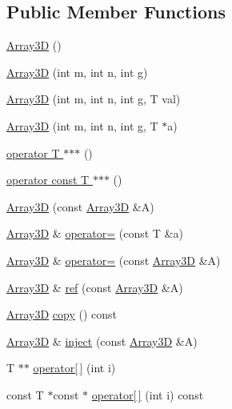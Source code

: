 \subsection*{Public Member Functions}
\begin{DoxyCompactItemize}
\item 
\hyperlink{classTNT_1_1Array3D_a94ceeeadc5904e9ec4069ef61394ff8e}{Array3\-D} ()
\item 
\hyperlink{classTNT_1_1Array3D_a3556263018d605d22ce74699f3898559}{Array3\-D} (int m, int n, int g)
\item 
\hyperlink{classTNT_1_1Array3D_a3e5d89a3999c39540a441aeebcd8edc4}{Array3\-D} (int m, int n, int g, T val)
\item 
\hyperlink{classTNT_1_1Array3D_a5830c3a1275b2498bdceb6502e63c28f}{Array3\-D} (int m, int n, int g, T $\ast$a)
\item 
\hyperlink{classTNT_1_1Array3D_a35b7704b6c061b4150d64592650ba83f}{operator T $\ast$$\ast$$\ast$} ()
\item 
\hyperlink{classTNT_1_1Array3D_a420ffed5ca81952d989afe406450a9b0}{operator const T $\ast$$\ast$$\ast$} ()
\item 
\hyperlink{classTNT_1_1Array3D_ae137326853df4e4cdcc52afff3f5d85a}{Array3\-D} (const \hyperlink{classTNT_1_1Array3D}{Array3\-D} \&A)
\item 
\hyperlink{classTNT_1_1Array3D}{Array3\-D} \& \hyperlink{classTNT_1_1Array3D_a405e5c9c24c7b3895533fa8f870f9bfd}{operator=} (const T \&a)
\item 
\hyperlink{classTNT_1_1Array3D}{Array3\-D} \& \hyperlink{classTNT_1_1Array3D_a13fa6cf87fcfc5847972569f325f9b56}{operator=} (const \hyperlink{classTNT_1_1Array3D}{Array3\-D} \&A)
\item 
\hyperlink{classTNT_1_1Array3D}{Array3\-D} \& \hyperlink{classTNT_1_1Array3D_aded40455c8a0b48c3c3d0688ea90180a}{ref} (const \hyperlink{classTNT_1_1Array3D}{Array3\-D} \&A)
\item 
\hyperlink{classTNT_1_1Array3D}{Array3\-D} \hyperlink{classTNT_1_1Array3D_abef414d4382ab6cac80bb32a53f8db55}{copy} () const 
\item 
\hyperlink{classTNT_1_1Array3D}{Array3\-D} \& \hyperlink{classTNT_1_1Array3D_ac9004a4cc385cbfc0d3b742efd605e1c}{inject} (const \hyperlink{classTNT_1_1Array3D}{Array3\-D} \&A)
\item 
T $\ast$$\ast$ \hyperlink{classTNT_1_1Array3D_aea9175ed3125b3061f3be0db72656518}{operator\mbox{[}$\,$\mbox{]}} (int i)
\item 
const T $\ast$const $\ast$ \hyperlink{classTNT_1_1Array3D_ad5587fca33f70c1b3b3f421fc5087c25}{operator\mbox{[}$\,$\mbox{]}} (int i) const 
$$
\end{DoxyCompactItemize}
